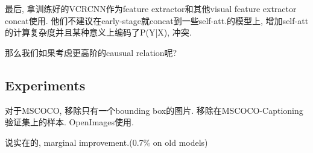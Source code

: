 \documentclass{article}
\begin{document}
最后, 拿训练好的VCRCNN作为feature extractor和其他visual feature extractor concat使用. 他们不建议在early-stage就concat到一些self-att.的模型上, 增加self-att的计算复杂度并且某种意义上编码了P(Y|X), 冲突.

\begin{remark}
    那么我们如果考虑更高阶的causual relation呢?
\end{remark}

\subsection{Experiments}

对于MSCOCO, 移除只有一个bounding box的图片. 移除在MSCOCO-Captioning验证集上的样本. OpenImages使用.
\begin{remark}
    说实在的, marginal improvement.(0.7\% on old models)
\end{remark}
\end{document}
